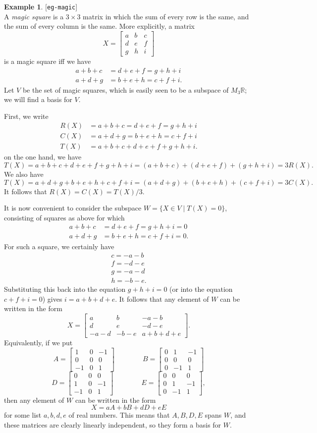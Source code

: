 \documentclass{amsart}
\newcommand{\lbl}[1]{\label{#1}\textup{[\texttt{#1}]}\ \\}
\newcommand{\lbl}{\label}
\newcommand{\R}         {{\mathbb{R}}}
\newcommand{\bsm}       {\left[\begin{smallmatrix}}
\newcommand{\esm}       {\end{smallmatrix}\right]}
\newcommand{\tm}        {\times}
\newcommand{\st}        {\;|\;}
\renewcommand{\:}       {\colon}
\theoremstyle{definition}
\newtheorem{example}[theorem]{Example}
\begin{document}
\begin{example}\lbl{eg-magic}
  A \emph{magic square} is a $3\tm 3$ matrix in which the sum of every
  row is the same, and the sum of every column is the same.  More
  explicitly, a matrix
  \[ X = \bsm a & b & c \\ d & e & f \\ g & h & i \esm \]
  is a magic square iff we have
  \begin{align*}
    a+b+c &= d+e+f = g+h+i \\
    a+d+g &= b+e+h = c+f+i. 
  \end{align*}
  Let $V$ be the set of magic squares, which is easily seen to be a
  subspace of $M_3\R$; we will find a basis for $V$.  

  First, we write
  \begin{align*}
    R(X) &= a+b+c = d+e+f = g+h+i \\
    C(X) &= a+d+g = b+e+h = c+f+i \\
    T(X) &= a+b+c+d+e+f+g+h+i.
  \end{align*}
  on the one hand, we have
  \[ T(X)=a+b+c+d+e+f+g+h+i=(a+b+c)+(d+e+f)+(g+h+i) = 3R(X). \]
  We also have
  \[ T(X)=a+d+g+b+e+h+c+f+i=(a+d+g)+(b+e+h)+(c+f+i) = 3C(X). \]
  It follows that $R(X)=C(X)=T(X)/3$.

  It is now convenient to consider the subspace
  $W=\{X\in V\st T(X)=0\}$, consisting of squares as above for which
  \begin{align*}
    a+b+c &= d+e+f = g+h+i = 0\\
    a+d+g &= b+e+h = c+f+i = 0.
  \end{align*}
  For such a square, we certainly have
  \begin{align*}
    c = -a-b \\
    f = -d-e \\
    g = -a-d \\
    h = -b-e.
  \end{align*}
  Substituting this back into the equation $g+h+i=0$ (or
  into the equation $c+f+i=0$) gives $i=a+b+d+e$.  It
  follows that any element of $W$ can be written in the form
  \[ X = \bsm a & b & -a-b \\
              d & e & -d-e \\
              -a-d & -b-e & a+b+d+e \esm.
  \]
  Equivalently, if we put
  \[ A = \bsm 1&0&-1 \\ 0&0&0 \\ -1&0&1 \esm \hspace{4em}
     B = \bsm 0&1&-1 \\ 0&0&0 \\ 0&-1&1 \esm \]
  \[ D = \bsm 0&0&0 \\ 1&0&-1 \\ -1&0&1 \esm \hspace{4em}
     E = \bsm 0&0&0 \\ 0&1&-1 \\ 0&-1&1 \esm,
  \]
  then any element of $W$ can be written in the form
  \[ X = aA + bB + dD + eE \]
  for some list $a,b,d,e$ of real numbers.  This means that
  $A,B,D,E$ spans $W$, and these matrices are clearly
  linearly independent, so they form a basis for $W$.


\end{example}
\end{document}
